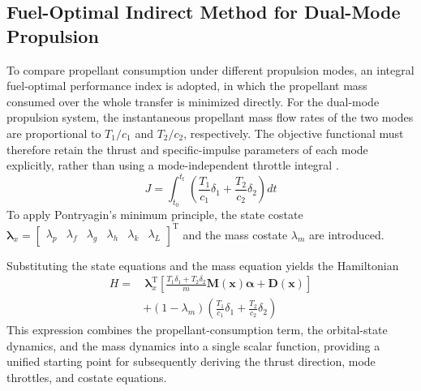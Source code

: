 ﻿\documentclass{IEEEtaes}
\begin{document}
\subsection{Fuel-Optimal Indirect Method for Dual-Mode Propulsion}
To compare propellant consumption under different propulsion modes, an integral fuel-optimal performance index is adopted, in which the propellant mass consumed over the whole transfer is minimized directly. For the dual-mode propulsion system, the instantaneous propellant mass flow rates of the two modes are proportional to $T_1/c_1$ and $T_2/c_2$, respectively. The objective functional must therefore retain the thrust and specific-impulse parameters of each mode explicitly, rather than using a mode-independent throttle integral \cite{cline2024a}.
\begin{equation}
J=\int_{t_0}^{t_{\mathrm{f}}}\left(\frac{T_1}{c_1}\delta_1+\frac{T_2}{c_2}\delta_2\right)dt
\end{equation}
To apply Pontryagin's minimum principle, the state costate $\bm{\lambda}_x=\begin{bmatrix}\lambda_p&\lambda_f&\lambda_g&\lambda_h&\lambda_k&\lambda_L\end{bmatrix}^{\mathrm{T}}$ and the mass costate $\lambda_m$ are introduced.

Substituting the state equations and the mass equation yields the Hamiltonian
\begin{equation}
\begin{aligned}
H=&\,\bm{\lambda}_x^{\mathrm{T}}\left[\frac{T_1\delta_1+T_2\delta_2}{m}\bm{M}(\bm{x})\bm{\alpha}+\bm{D}(\bm{x})\right]\\
&+(1-\lambda_m)\left(\frac{T_1}{c_1}\delta_1+\frac{T_2}{c_2}\delta_2\right)
\end{aligned}
\end{equation}
This expression combines the propellant-consumption term, the orbital-state dynamics, and the mass dynamics into a single scalar function, providing a unified starting point for subsequently deriving the thrust direction, mode throttles, and costate equations.
\end{document}
